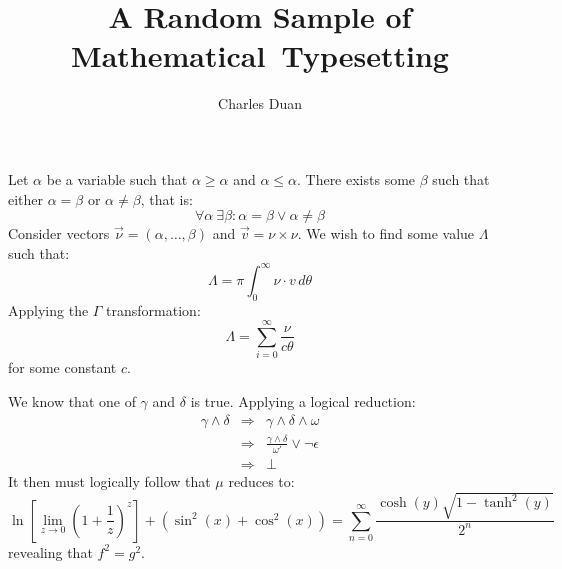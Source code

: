 \documentclass[12pt]{article}
\title{A Random Sample of Mathematical~Typesetting}
\author{Charles Duan}
\begin{document}
\maketitle

Let $\alpha$ be a variable such that $\alpha\ge\alpha$ and $\alpha\le\alpha$.
There exists some $\beta$ such that either $\alpha=\beta$ or $\alpha\ne\beta$,
that is:
\[
\forall\alpha\:\exists\beta: \alpha=\beta\vee\alpha\ne\beta
\]
Consider vectors $\vec\nu=(\alpha,\ldots,\beta)$ and $\vec v=\nu\times\nu$. We
wish to find some value $\Lambda$ such that:
\[
\Lambda = \pi \int_{0}^{\infty} \nu\cdot v\,d\theta
\]
Applying the $\Gamma$ transformation:
\[
\Lambda = \sum_{i=0}^{\infty}\frac{\nu}{c\theta}
\]
for some constant $c$.

We know that one of $\gamma$ and $\delta$ is true. Applying a logical reduction:
\begin{eqnarray*}
\gamma\wedge\delta &\Longrightarrow& \gamma\wedge\delta\wedge\omega \\
&\Longrightarrow& \frac{\gamma\wedge\delta}{\omega'}\vee\neg\epsilon \\
&\Longrightarrow& \perp
\end{eqnarray*}
It then must logically follow that $\mu$ reduces to:
\[
\ln\left[\lim_{z\rightarrow0}\left(1+\frac{1}{z}\right)^z\right]
+ \left(\sin^2(x) + \cos^2(x)\right)
= \sum_{n=0}^\infty \frac{\cosh(y)\sqrt{1-\tanh^2(y)}}{2^n}
\]
revealing that $f^2=g^2$.
\end{document}
